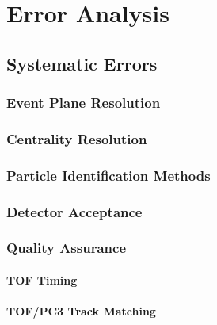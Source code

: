 
\chapter{Error Analysis} %

\section{Systematic Errors}
\subsection{Event Plane Resolution}
\subsection{Centrality Resolution}
\subsection{Particle Identification Methods}
\subsection{Detector Acceptance}
\subsection{Quality Assurance}
\subsubsection{TOF Timing}
\subsubsection{TOF/PC3 Track Matching}
\pagebreak
\pagebreak
